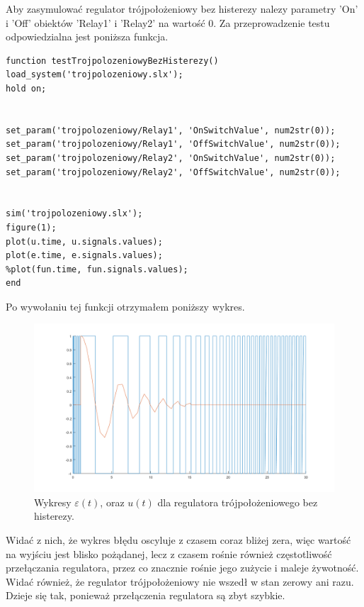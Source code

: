 \documentclass[a4paper,10pt]{article}
\begin{document}
Aby zasymulować regulator trójpołożeniowy bez histerezy nalezy parametry 'On' i 'Off' obiektów 'Relay1' i 'Relay2' na wartość 0.
\newpage Za przeprowadzenie testu odpowiedzialna jest poniższa funkcja.

\begin{lstlisting}[caption=Funkcja testująca regulator trójpołożeniowy bez histerezy.]
function testTrojpolozeniowyBezHisterezy()
load_system('trojpolozeniowy.slx');
hold on;


set_param('trojpolozeniowy/Relay1', 'OnSwitchValue', num2str(0));
set_param('trojpolozeniowy/Relay1', 'OffSwitchValue', num2str(0));
set_param('trojpolozeniowy/Relay2', 'OnSwitchValue', num2str(0));
set_param('trojpolozeniowy/Relay2', 'OffSwitchValue', num2str(0));


sim('trojpolozeniowy.slx');
figure(1);
plot(u.time, u.signals.values);
plot(e.time, e.signals.values);
%plot(fun.time, fun.signals.values);
end
\end{lstlisting}

Po wywołaniu tej funkcji otrzymałem poniższy wykres.

\begin{figure}[!h]
    \centering
	\includegraphics[width=120mm]{troj_bez_his.png}
	\caption{Wykresy $\varepsilon(t)$, oraz $u(t)$ dla regulatora trójpołożeniowego bez histerezy.}
    \label{fig:Rysunek}
\end{figure}

\newpage Widać z nich, że wykres błędu oscyluje z czasem coraz bliżej zera, więc wartość na wyjściu jest blisko pożądanej, lecz z czasem rośnie również częstotliwość przełączania regulatora, przez co znacznie rośnie jego zużycie i maleje żywotność. \\
Widać również, że regulator trójpołożeniowy nie wszedł w stan zerowy ani razu. Dzieje się tak, ponieważ przełączenia regulatora są zbyt szybkie.
\end{document}
